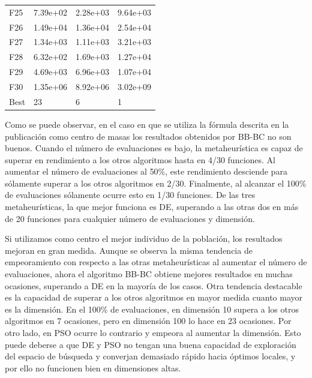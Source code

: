 \begin{table}[H]
\begin{minipage}{.5\linewidth}
\begin{tabular}{llll}
        F25  &  7.39e+02 &   2.28e+03 &  9.64e+03 \\
        F26  &  1.49e+04 &   1.36e+04 &  2.54e+04 \\
        F27  &  1.34e+03 &   1.11e+03 &  3.21e+03 \\
        F28  &  6.32e+02 &   1.69e+03 &  1.27e+04 \\
        F29  &  4.69e+03 &   6.96e+03 &  1.07e+04 \\
        F30  &  1.35e+06 &   8.92e+06 &  3.02e+09 \\
        Best &        23 &          6 &         1 \\
        \bottomrule
        \end{tabular}
        
    \end{minipage} 
\end{table}

\newpage
Como se puede observar, en el caso en que se utiliza la fórmula descrita en la publicación como centro de masas los resultados obtenidos por BB-BC no son buenos. Cuando el número de evaluaciones es bajo, la metaheurística es capaz de superar en rendimiento a los otros algoritmos hasta en 4/30 funciones. Al aumentar el número de evaluaciones al 50\%, este rendimiento desciende para sólamente superar a los otros algoritmos en 2/30. Finalmente, al alcanzar el 100\% de evaluaciones sólamente ocurre esto en 1/30 funciones. De las tres metaheurísticas, la que mejor funciona es DE, superando a las otras dos en más de 20 funciones para cualquier número de evaluaciones y dimensión. 

Si utilizamos como centro el mejor individuo de la población, los resultados mejoran en gran medida. Aunque se observa la misma tendencia de empeoramiento con respecto a las otras metaheurísticas al aumentar el número de evaluaciones, ahora el algoritmo BB-BC obtiene mejores resultados en muchas ocasiones, superando a DE en la mayoría de los casos. Otra tendencia destacable es la capacidad de superar a los otros algoritmos en mayor medida cuanto mayor es la dimensión. En el 100\% de evaluaciones, en dimensión 10 supera a los otros algoritmos en 7 ocasiones, pero en dimensión 100 lo hace en 23 ocasiones. Por otro lado, en PSO ocurre lo contrario y empeora al aumentar la dimensión. Esto puede deberse a que DE y PSO no tengan una buena capacidad de exploración del espacio de búsqueda y converjan demasiado rápido hacia óptimos locales, y por ello no funcionen bien en dimensiones altas.

